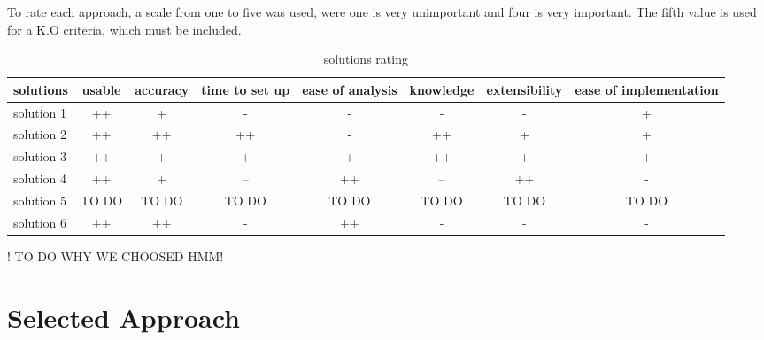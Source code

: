 To rate each approach, a scale from one to five was used, were one is very unimportant and four is very important. The fifth value is used for a K.O criteria, which must be included.

\begin{table}[h]
\begin{tabular}{|l|c|c|c|c|c|c|c|}
\hline
\textbf{solutions} & usable & accuracy & time to set up & ease of analysis & knowledge & extensibility & ease of implementation \\
\hline
solution 1 &\cellcolor[HTML]{38761d}++&\cellcolor[HTML]{93c47d}+&\cellcolor[HTML]{dd7e6b}-&\cellcolor[HTML]{dd7e6b}-&\cellcolor[HTML]{dd7e6b}-&\cellcolor[HTML]{dd7e6b}-&\cellcolor[HTML]{93c47d}+ \\
\hline
solution 2 &\cellcolor[HTML]{38761d}++&\cellcolor[HTML]{38761d}++&\cellcolor[HTML]{38761d}++&\cellcolor[HTML]{dd7e6b}-&\cellcolor[HTML]{38761d}++&\cellcolor[HTML]{93c47d}+&\cellcolor[HTML]{93c47d}+\\
\hline
solution 3 &\cellcolor[HTML]{38761d}++&\cellcolor[HTML]{93c47d}+&\cellcolor[HTML]{93c47d}+&\cellcolor[HTML]{93c47d}+&\cellcolor[HTML]{38761d}++&\cellcolor[HTML]{93c47d}+&\cellcolor[HTML]{93c47d}+\\
\hline
solution 4 &\cellcolor[HTML]{38761d}++&\cellcolor[HTML]{93c47d}+&\cellcolor[HTML]{cc4125}--&\cellcolor[HTML]{38761d}++&\cellcolor[HTML]{cc4125}--&\cellcolor[HTML]{38761d}++&\cellcolor[HTML]{dd7e6b}-\\
\hline
solution 5 &TO DO & TO DO & TO DO & TO DO & TO DO & TO DO & TO DO \\
\hline
solution 6 &\cellcolor[HTML]{38761d}++&\cellcolor[HTML]{38761d}++&\cellcolor[HTML]{dd7e6b}-&\cellcolor[HTML]{38761d}++&\cellcolor[HTML]{dd7e6b}-&\cellcolor[HTML]{dd7e6b}-&\cellcolor[HTML]{dd7e6b}-\\
\hline
\end{tabular}
\caption{ solutions rating }
\end{table}

! TO DO WHY WE CHOOSED HMM!

\section{Selected Approach}




